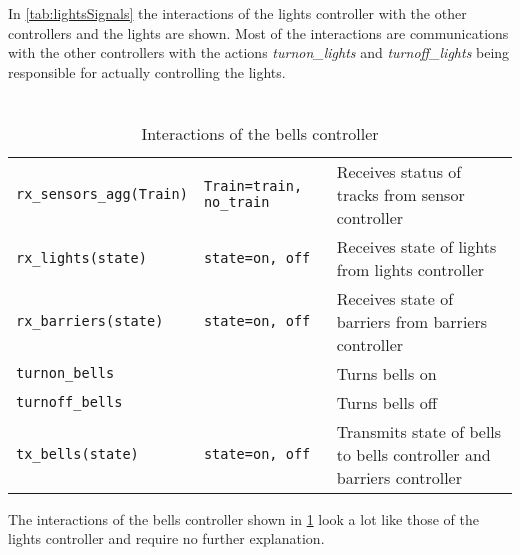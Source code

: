 \documentclass[final]{report}
\begin{document}
In \cref{tab:lightsSignals} the interactions of the lights controller with the other controllers and the lights are shown.
Most of the interactions are communications with the other controllers with the actions \textit{turnon\_lights} and \textit{turnoff\_lights} being responsible for actually controlling the lights.

\section{}
\begin{table}[H]
\centering
    \begin{tabular}{|l|l|l|}
    \hline
    \texttt{rx\_sensors\_agg(Train)} & \texttt{Train=train, no\_train} & Receives status of tracks from sensor controller                     \\
    \texttt{rx\_lights(state)}       & \texttt{state=on, off}          & Receives state of lights from lights controller                      \\
    \texttt{rx\_barriers(state)}     & \texttt{state=on, off}          & Receives state of barriers from barriers controller                  \\ \hline
    \texttt{turnon\_bells}           &                                 & Turns bells on                                                       \\
    \texttt{turnoff\_bells}          &                                 & Turns bells off                                                      \\
    \texttt{tx\_bells(state)}        & \texttt{state=on, off}          & Transmits state of bells to bells controller and barriers controller \\ \hline
    \end{tabular}
\caption{Interactions of the bells controller}
\label{tab:bellsSignals}
\end{table}

The interactions of the bells controller shown in \cref{tab:bellsSignals} look a lot like those of the lights controller and require no further explanation.
\end{document}
